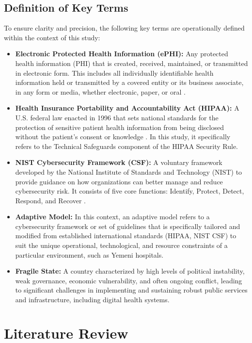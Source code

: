 \documentclass[12pt, a4paper, oneside]{report}
\begin{document}
	\section{Definition of Key Terms}
	To ensure clarity and precision, the following key terms are operationally defined within the context of this study:
	\begin{itemize}
		\item \textbf{Electronic Protected Health Information (ePHI):} Any protected health information (PHI) that is created, received, maintained, or transmitted in electronic form. This includes all individually identifiable health information held or transmitted by a covered entity or its business associate, in any form or media, whether electronic, paper, or oral \cite{hhs2024hipaa}.
		\item \textbf{Health Insurance Portability and Accountability Act (HIPAA):} A U.S. federal law enacted in 1996 that sets national standards for the protection of sensitive patient health information from being disclosed without the patient's consent or knowledge \cite{hhs2024hipaa}. In this study, it specifically refers to the Technical Safeguards component of the HIPAA Security Rule.
		\item \textbf{NIST Cybersecurity Framework (CSF):} A voluntary framework developed by the National Institute of Standards and Technology (NIST) to provide guidance on how organizations can better manage and reduce cybersecurity risk. It consists of five core functions: Identify, Protect, Detect, Respond, and Recover \cite{rahmany2026aida}.
		\item \textbf{Adaptive Model:} In this context, an adaptive model refers to a cybersecurity framework or set of guidelines that is specifically tailored and modified from established international standards (HIPAA, NIST CSF) to suit the unique operational, technological, and resource constraints of a particular environment, such as Yemeni hospitals.
		\item \textbf{Fragile State:} A country characterized by high levels of political instability, weak governance, economic vulnerability, and often ongoing conflict, leading to significant challenges in implementing and sustaining robust public services and infrastructure, including digital health systems.
		
	\end{itemize}
	\chapter{Literature Review}
\end{document}
